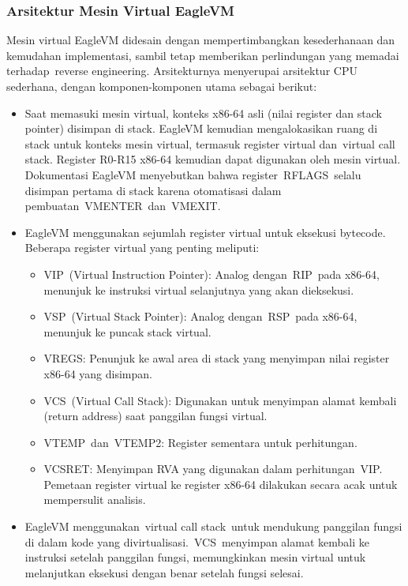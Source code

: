 \subsubsection{Arsitektur Mesin Virtual EagleVM}
Mesin virtual EagleVM didesain dengan mempertimbangkan kesederhanaan dan kemudahan implementasi, sambil tetap memberikan perlindungan yang memadai terhadap reverse engineering. Arsitekturnya menyerupai arsitektur CPU sederhana, dengan komponen-komponen utama sebagai berikut:
\begin{itemize}
	\item {} Saat memasuki mesin virtual, konteks x86-64 asli (nilai register dan stack pointer) disimpan di stack. EagleVM kemudian mengalokasikan ruang di stack untuk konteks mesin virtual, termasuk register virtual dan virtual call stack. Register R0-R15 x86-64 kemudian dapat digunakan oleh mesin virtual. Dokumentasi EagleVM menyebutkan bahwa register RFLAGS selalu disimpan pertama di stack karena otomatisasi dalam pembuatan VMENTER dan VMEXIT.
	\item {} EagleVM menggunakan sejumlah register virtual untuk eksekusi bytecode. Beberapa register virtual yang penting meliputi:
	      \begin{itemize}
		      \item VIP (Virtual Instruction Pointer): Analog dengan RIP pada x86-64, menunjuk ke instruksi virtual selanjutnya yang akan dieksekusi.
		      \item VSP (Virtual Stack Pointer): Analog dengan RSP pada x86-64, menunjuk ke puncak stack virtual.
		      \item VREGS: Penunjuk ke awal area di stack yang menyimpan nilai register x86-64 yang disimpan.
		      \item VCS (Virtual Call Stack): Digunakan untuk menyimpan alamat kembali (return address) saat panggilan fungsi virtual.
		      \item VTEMP dan VTEMP2: Register sementara untuk perhitungan.
		      \item VCSRET: Menyimpan RVA yang digunakan dalam perhitungan VIP. Pemetaan register virtual ke register x86-64 dilakukan secara acak untuk mempersulit analisis.
	      \end{itemize}
	\item {} EagleVM menggunakan virtual call stack untuk mendukung panggilan fungsi di dalam kode yang divirtualisasi. VCS menyimpan alamat kembali ke instruksi setelah panggilan fungsi, memungkinkan mesin virtual untuk melanjutkan eksekusi dengan benar setelah fungsi selesai.

\end{itemize}
